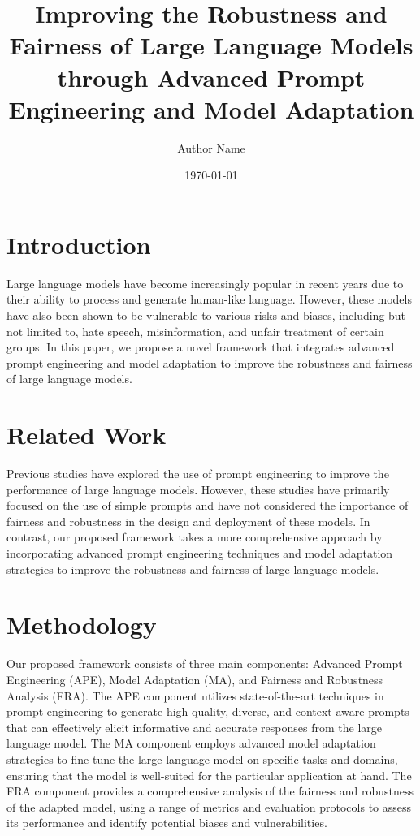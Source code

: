 \documentclass{article}
\title{Improving the Robustness and Fairness of Large Language Models through Advanced Prompt Engineering and Model Adaptation}
\author{Author Name}
\date{\today}
\begin{document}
\maketitle

\section{Introduction}

Large language models have become increasingly popular in recent years due to their ability to process and generate human-like language. However, these models have also been shown to be vulnerable to various risks and biases, including but not limited to, hate speech, misinformation, and unfair treatment of certain groups. In this paper, we propose a novel framework that integrates advanced prompt engineering and model adaptation to improve the robustness and fairness of large language models.

\section{Related Work}

Previous studies have explored the use of prompt engineering to improve the performance of large language models. However, these studies have primarily focused on the use of simple prompts and have not considered the importance of fairness and robustness in the design and deployment of these models. In contrast, our proposed framework takes a more comprehensive approach by incorporating advanced prompt engineering techniques and model adaptation strategies to improve the robustness and fairness of large language models.

\section{Methodology}

Our proposed framework consists of three main components: Advanced Prompt Engineering (APE), Model Adaptation (MA), and Fairness and Robustness Analysis (FRA). The APE component utilizes state-of-the-art techniques in prompt engineering to generate high-quality, diverse, and context-aware prompts that can effectively elicit informative and accurate responses from the large language model. The MA component employs advanced model adaptation strategies to fine-tune the large language model on specific tasks and domains, ensuring that the model is well-suited for the particular application at hand. The FRA component provides a comprehensive analysis of the fairness and robustness of the adapted model, using a range of metrics and evaluation protocols to assess its performance and identify potential biases and vulnerabilities.
\end{document}
